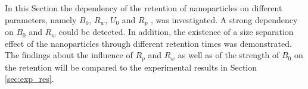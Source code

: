 \FloatBarrier
In this Section the dependency of the retention of nanoparticles on different parameters, namely $B_{0}$, $R_{w}$, $U_{0}$ and $R_{p}$ , was investigated. A strong dependency on $B_{0}$ and $R_{w}$ could be detected. In addition, the existence of a size separation effect of the nanoparticles through different retention times was demonstrated. The findings about the influence of $R_{p}$ and $R_{w}$ as well as of the strength of $B_{0}$ on the retention will be compared to the experimental results in Section\,\ref{sec:exp_res}.


% 
% 
